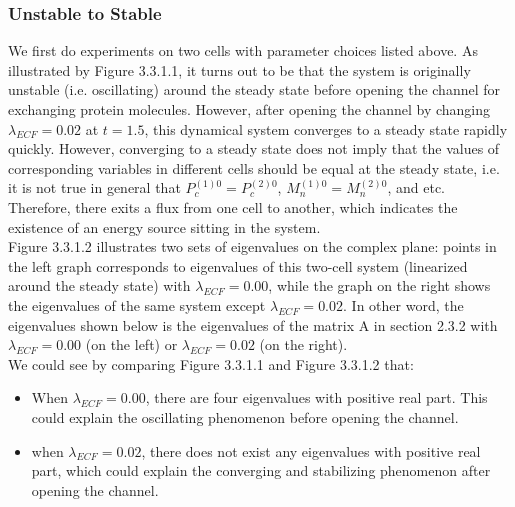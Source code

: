 \documentclass[12pt]{article}
\renewcommand{\(}{\left (}
\renewcommand{\)}{\right )}
\begin{document}
\subsubsection{Unstable to Stable}
\hspace{5mm} We first do experiments on two cells with parameter choices listed above. As illustrated by Figure 3.3.1.1, it turns out to be that the system is originally unstable (i.e. oscillating) around the steady state before opening the channel for exchanging protein molecules. However, after opening the channel by changing $\lambda_{ECF} = 0.02$ at $t = 1.5$, this dynamical system converges to a steady state rapidly quickly. However, converging to a steady state does not imply that the values of corresponding variables in different cells should be equal at the steady state, i.e. it is not true in general that $P_c^{(1)0} = P_c^{(2)0}$, $M_n^{(1)0} = M_n^{(2)0}$, and etc. Therefore, there exits a flux from one cell to another, which indicates the existence of an energy source sitting in the system. \\

Figure 3.3.1.2 illustrates two sets of eigenvalues on the complex plane: points in the left graph corresponds to eigenvalues of this two-cell system (linearized around the steady state) with $\lambda_{ECF} = 0.00$, while the graph on the right shows the eigenvalues of the same system except $\lambda_{ECF} = 0.02$. In other word, the eigenvalues shown below is the eigenvalues of the matrix A in section 2.3.2 with $\lambda_{ECF} = 0.00$ (on the left) or $\lambda_{ECF} = 0.02$ (on the right). \\

We could see by comparing Figure 3.3.1.1 and Figure 3.3.1.2 that: \\
\begin{itemize}
    \item When $\lambda_{ECF} = 0.00$, there are four eigenvalues with positive real part. This could explain the oscillating phenomenon before opening the channel.
    \item when $\lambda_{ECF} = 0.02$, there does not exist any eigenvalues with positive real part, which could explain the converging and stabilizing phenomenon after opening the channel.
\end{itemize}

\newpage
\end{document}
